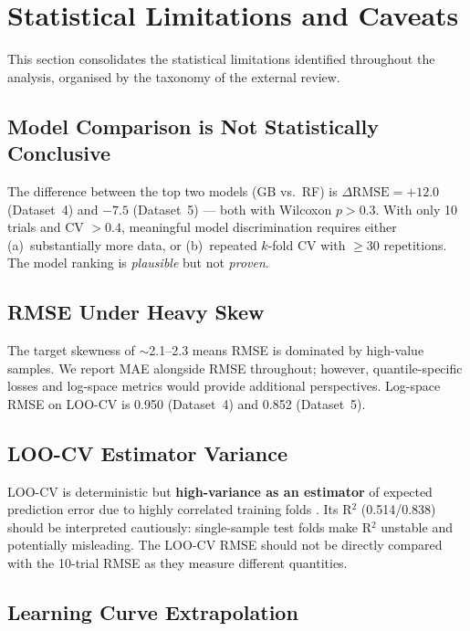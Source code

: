 \documentclass[12pt,a4paper]{article}
\begin{document}
\section{Statistical Limitations and Caveats}
\label{sec:limitations}

This section consolidates the statistical limitations identified throughout
the analysis, organised by the taxonomy of the external review.

\subsection{Model Comparison is Not Statistically Conclusive}

The difference between the top two models (GB vs.\ RF) is
$\Delta\text{RMSE} = +12.0$ (Dataset~4) and $-7.5$ (Dataset~5) —
both with Wilcoxon $p > 0.3$.  With only 10 trials and CV $> 0.4$,
meaningful model discrimination requires either (a)~substantially
more data, or (b)~repeated $k$-fold CV with $\geq$30 repetitions.
The model ranking is \emph{plausible} but not \emph{proven}.

\subsection{RMSE Under Heavy Skew}

The target skewness of $\sim$2.1--2.3 means RMSE is dominated by
high-value samples.  We report MAE alongside RMSE throughout; however,
quantile-specific losses and log-space metrics would provide additional
perspectives.  Log-space RMSE on LOO-CV is 0.950 (Dataset~4) and 0.852
(Dataset~5).

\subsection{LOO-CV Estimator Variance}

LOO-CV is deterministic but \textbf{high-variance as an estimator} of
expected prediction error due to highly correlated training folds
\citep{Hastie2009}.  Its R$^2$ (0.514/0.838) should be interpreted
cautiously: single-sample test folds make R$^2$ unstable and potentially
misleading.  The LOO-CV RMSE should not be directly compared with the
10-trial RMSE as they measure different quantities.

\subsection{Learning Curve Extrapolation}
\end{document}
